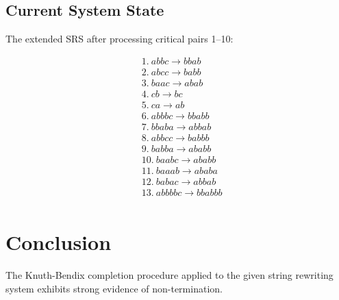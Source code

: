 \documentclass{article}
\begin{document}
\subsection{Current System State}

The extended SRS after processing critical pairs 1--10:

\begin{align*}
&1.\ abbc \to bbab \\
&2.\ abcc \to babb \\  
&3.\ baac \to abab \\
&4.\ cb \to bc \\
&5.\ ca \to ab \\
&6.\ abbbc \to bbabb \\
&7.\ bbaba \to abbab \\
&8.\ abbcc \to babbb \\
&9.\ babba \to ababb \\
&10.\ baabc \to ababb \\
&11.\ baaab \to ababa \\
&12.\ babac \to abbab \\
&13.\ abbbbc \to bbabbb \\
\end{align*}

\section{Conclusion}

The Knuth-Bendix completion procedure applied to the given string rewriting system exhibits strong evidence of non-termination.
\end{document}

